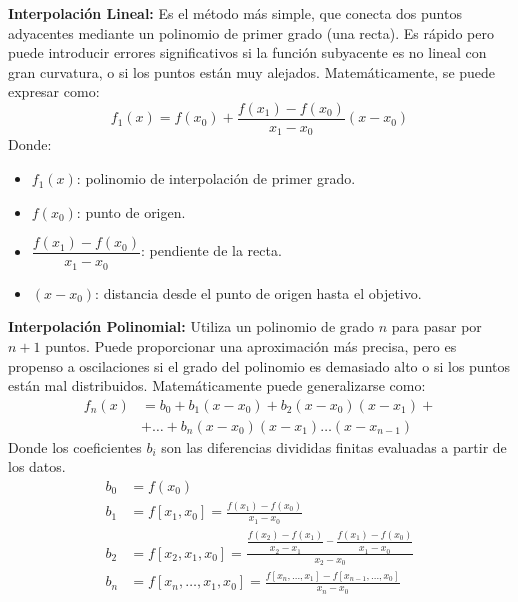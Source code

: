 \textbf{Interpolación Lineal:} Es el método más simple, que conecta dos puntos adyacentes mediante un polinomio de primer grado (una recta). Es rápido pero puede introducir errores significativos si la función subyacente es no lineal con gran curvatura, o si los puntos están muy alejados. Matemáticamente, se puede expresar como:
\begin{equation}
    f_1(x) = f(x_0) + \frac{f(x_1) - f(x_0)}{x_1 - x_0} (x - x_0)
\end{equation}
Donde:
\begin{itemize}[label={}, leftmargin=*]
    \item $f_1(x)$: polinomio de interpolación de primer grado.
    \item $f(x_0)$: punto de origen.
    \item $\dfrac{f(x_1) - f(x_0)}{x_1 - x_0}$: pendiente de la recta.
    \item $(x - x_0)$: distancia desde el punto de origen hasta el objetivo.
\end{itemize}

\textbf{Interpolación Polinomial:} Utiliza un polinomio de grado $n$ para pasar por $n+1$ puntos. Puede proporcionar una aproximación más precisa, pero es propenso a oscilaciones si el grado del polinomio es demasiado alto o si los puntos están mal distribuidos. Matemáticamente puede generalizarse como:
\begin{align*}
    f_n(x) &= b_0 + b_1(x - x_0) + b_2(x - x_0)(x - x_1)+ \\
           & + \ldots + b_n(x - x_0)(x - x_1) \ldots (x - x_{n-1})
\end{align*}
Donde los coeficientes $b_i$ son las diferencias divididas finitas evaluadas a partir de los datos.
\begin{align*}
    b_0 &= f(x_0) \\
    b_1 &= f[x_1, x_0] = \frac{f(x_1) - f(x_0)}{x_1 - x_0} \\
    b_2 &= f[x_2, x_1, x_0] = \frac{\dfrac{f(x_2) - f(x_1)}{x_2 - x_1} - \dfrac{f(x_1) - f(x_0)}{x_1 - x_0}}{x_2 - x_0} \\
    b_n &= f[x_n, \ldots, x_1, x_0] = \frac{f[x_n, \ldots, x_1] - f[x_{n-1}, \ldots, x_0]}{x_n - x_0}
\end{align*}